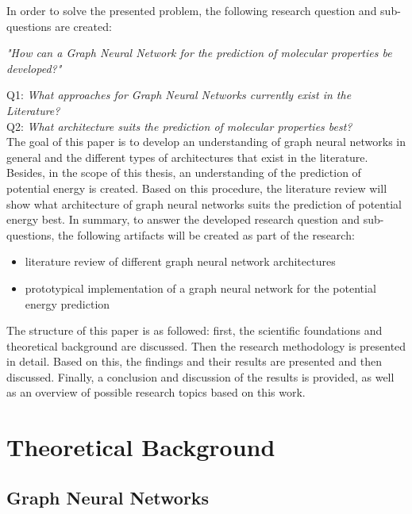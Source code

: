 In order to solve the presented problem, the following research question and sub-questions are created: 
\begin{center}
    \textit{"How can a Graph Neural Network for the prediction of molecular properties be developed?"} \\
\end{center}
Q1: \textit{What approaches for Graph Neural Networks currently exist in the Literature?} \\
Q2: \textit{What architecture suits the prediction of molecular properties best?} \\

The goal of this paper is to develop an understanding of graph neural networks in general and the different types of architectures that exist in the literature. Besides, in the scope of this thesis, an understanding of the prediction of potential energy is created. Based on this procedure, the literature review will show what architecture of graph neural networks suits the prediction of potential energy best. In summary, to answer the developed research question and sub-questions, the following artifacts will be created as part of the research: 

\begin{itemize}
    \item literature review of different graph neural network architectures
    \item prototypical implementation of a graph neural network for the potential energy prediction
\end{itemize}  

The structure of this paper is as followed: first, the scientific foundations and theoretical background are discussed. Then the research methodology is presented in detail. Based on this, the findings and their results are presented and then discussed. Finally, a conclusion and discussion of the results is provided, as well as an overview of possible research topics based on this work.  

\section{Theoretical Background}
\subsection{Graph Neural Networks}

